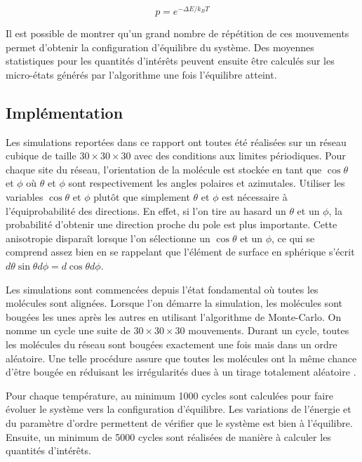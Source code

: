 \documentclass[11pt,a4paper]{article}
\numberwithin{equation}{section}
\begin{document}
\begin{equation}
p = e^{-\Delta E / k_B T}
\end{equation}

Il est possible de montrer qu'un grand nombre de répétition de ces mouvements permet d'obtenir la configuration d'équilibre du système. Des moyennes statistiques pour les quantités d'intérêts peuvent ensuite être calculés sur les micro-états générés par l'algorithme une fois l'équilibre atteint.

\subsection{Implémentation}
Les simulations reportées dans ce rapport ont toutes été réalisées sur un réseau cubique de taille $30\times 30\times 30$ avec des conditions aux limites périodiques. Pour chaque site du réseau, l'orientation de la molécule est stockée en tant que $\cos \theta$ et $\phi$ où $\theta$ et $\phi$ sont respectivement les angles polaires et azimutales. Utiliser les variables $\cos \theta$ et $\phi$ plutôt que simplement $\theta$ et $\phi$ est nécessaire à l'équiprobabilité des directions. En effet, si l'on tire au hasard un $\theta$ et un $\phi$, la probabilité d'obtenir une direction proche du pole est plus importante. Cette anisotropie disparaît lorsque l'on sélectionne un $\cos \theta$ et un $\phi$, ce qui se comprend assez bien en se rappelant que l'élément de surface en sphérique s'écrit $d\theta \sin \theta d\phi = d\cos\theta d\phi$.
\medskip
 
Les simulations sont commencées depuis l'état fondamental où toutes les molécules sont alignées. Lorsque l'on démarre la simulation, les molécules sont bougées les unes après les autres en utilisant l'algorithme de Monte-Carlo. On nomme un cycle une suite de $30\times 30\times 30$ mouvements. Durant un cycle, toutes les molécules du réseau sont bougées exactement une fois mais dans un ordre aléatoire. Une telle procédure assure que toutes les molécules ont la même chance d'être bougée en réduisant les irrégularités dues à un tirage totalement aléatoire \cite{fabbri}. 
\medskip

Pour chaque température, au minimum 1000 cycles sont calculées pour faire évoluer le système vers la configuration d'équilibre. Les variations de l'énergie et du paramètre d'ordre permettent de vérifier que le système est bien à l'équilibre. Ensuite, un minimum de 5000 cycles sont réalisées de manière à calculer les quantités d'intérêts.
\end{document}
